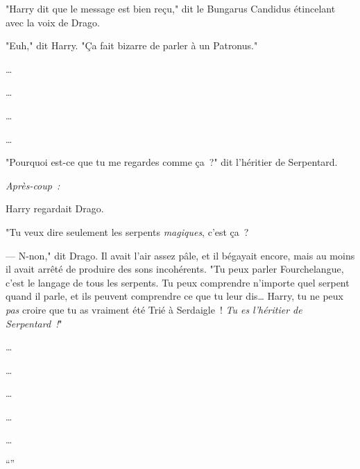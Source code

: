 "Harry dit que le message est bien reçu," dit le Bungarus Candidus étincelant avec la voix de Drago.

"Euh," dit Harry. "Ça fait bizarre de parler à un Patronus."

…

…

…

…

"Pourquoi est-ce que tu me regardes comme ça~?" dit l'héritier de Serpentard.

\later

\emph{Après-coup~:}

Harry regardait Drago.

"Tu veux dire seulement les serpents \emph{magiques}, c'est ça~?

--- N-non," dit Drago. Il avait l'air assez pâle, et il bégayait encore, mais au moins il avait arrêté de produire des sons incohérents. "Tu peux parler Fourchelangue, c'est le langage de tous les serpents. Tu peux comprendre n'importe quel serpent quand il parle, et ils peuvent comprendre ce que tu leur dis… Harry, tu ne peux \emph{pas} croire que tu as vraiment été Trié à Serdaigle~! \emph{Tu es l'héritier de Serpentard~!}"

…

…

…

…

…

“” 

